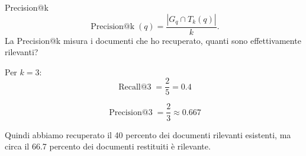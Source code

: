 \begin{definition}{Precision@k}
\begin{equation}
\operatorname{Precision@k}(q)=\frac{|G_q\cap T_k(q)|}{k}.
\end{equation}
La Precision@k misura i documenti che ho recuperato, quanti sono effettivamente rilevanti?
\end{definition}

\begin{example}{}
Per \(k=3\):
\[
\operatorname{Recall@3}=\frac{2}{5}=0.4
\]

\[
\operatorname{Precision@3}=\frac{2}{3}\approx0.667
\]

Quindi abbiamo recuperato il 40 percento dei documenti rilevanti esistenti, ma circa il 66.7 percento dei documenti restituiti è rilevante.
\end{example}


